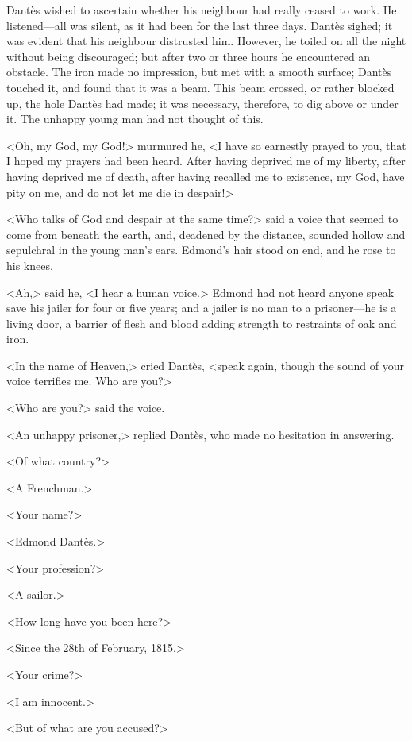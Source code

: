 Dantès wished to ascertain whether his neighbour had really ceased to work. He listened—all was silent, as it had been for the last three days. Dantès sighed; it was evident that his neighbour distrusted him. However, he toiled on all the night without being discouraged; but after two or three hours he encountered an obstacle. The iron made no impression, but met with a smooth surface; Dantès touched it, and found that it was a beam. This beam crossed, or rather blocked up, the hole Dantès had made; it was necessary, therefore, to dig above or under it. The unhappy young man had not thought of this. 

 <Oh, my God, my God!> murmured he, <I have so earnestly prayed to you, that I hoped my prayers had been heard. After having deprived me of my liberty, after having deprived me of death, after having recalled me to existence, my God, have pity on me, and do not let me die in despair!>

<Who talks of God and despair at the same time?> said a voice that seemed to come from beneath the earth, and, deadened by the distance, sounded hollow and sepulchral in the young man's ears. Edmond's hair stood on end, and he rose to his knees. 

 <Ah,> said he, <I hear a human voice.> Edmond had not heard anyone speak save his jailer for four or five years; and a jailer is no man to a prisoner—he is a living door, a barrier of flesh and blood adding strength to restraints of oak and iron. 

 <In the name of Heaven,> cried Dantès, <speak again, though the sound of your voice terrifies me. Who are you?> 

 <Who are you?> said the voice. 

 <An unhappy prisoner,> replied Dantès, who made no hesitation in answering. 

 <Of what country?> 

 <A Frenchman.> 

 <Your name?> 

 <Edmond Dantès.> 

 <Your profession?> 

 <A sailor.> 

 <How long have you been here?> 

 <Since the 28th of February, 1815.> 

 <Your crime?> 

 <I am innocent.> 

 <But of what are you accused?> 


